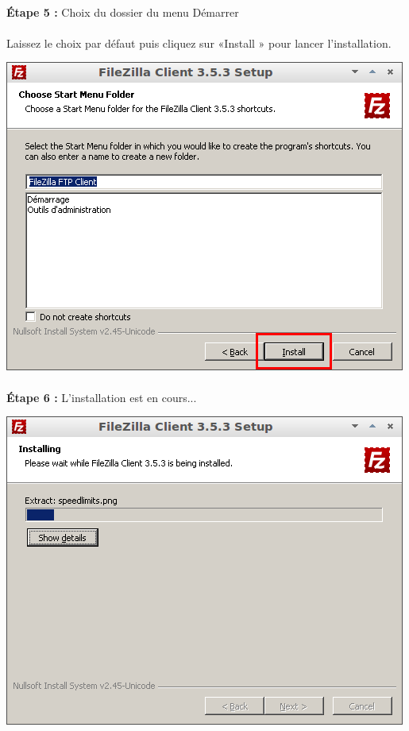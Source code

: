 \documentclass[10pt,a4paper]{article}
\begin{document}
\paragraph{}\textbf{Étape 5 : }Choix du dossier du menu Démarrer
\paragraph{}Laissez le choix par défaut puis cliquez sur «Install » pour lancer l'installation.
\begin{center}
\includegraphics[scale=0.5]{img/0020.png}
\end{center}
\paragraph{}\textbf{Étape 6 : }L'installation est en cours...
\begin{center}
\includegraphics[scale=0.5]{img/0021.png}
\end{center}
\end{document}
